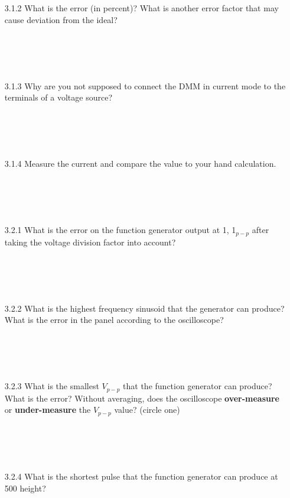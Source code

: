 \documentclass{article}
\begin{document}
\begin{enumerate}
  \item[3.1.2] What is the error (in percent)? What is another error factor that may cause deviation from the ideal?
    ~\\~\\~\\~\\~\\
  \item[3.1.3] Why are you not supposed to connect the DMM in current mode to the terminals of a voltage source?
    ~\\~\\~\\~\\~\\
  \item[3.1.4] Measure the current and compare the value to your hand calculation.
    ~\\~\\~\\~\\~\\
  \item[3.2.1] What is the error on the function generator output at \unit{1}{\kilo\hertz}, \unit{1}{\volt}$_{p-p}$ after taking the voltage division factor into account?
    ~\\~\\~\\~\\~\\
    \item[3.2.2] What is the highest frequency sinusoid that the generator can produce? What is the error in the panel according to the oscilloscope?
    ~\\~\\~\\~\\~\\
  \item[3.2.3] What is the smallest $V_{p-p}$ that the function generator can produce? What is the error? Without averaging, does the oscilloscope \textbf{over-measure} or \textbf{under-measure} the $V_{p-p}$ value? (circle one)
    ~\\~\\~\\~\\~\\
  \item[3.2.4] What is the shortest pulse that the function generator can produce at \unit{500}{\milli\volt} height?
    ~\\~\\~\\

\end{enumerate}
\end{document}
